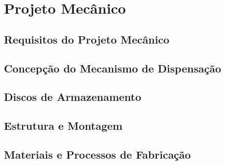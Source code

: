 
\chapter{Projeto Mecânico}
\label{chap:projeto-mecanico}


\section{Requisitos do Projeto Mecânico}
\label{sec:requisitos-mecanicos}


\section{Concepção do Mecanismo de Dispensação}
\label{sec:concepcao-mecanica}


\section{Discos de Armazenamento}
\label{sec:discos-armazenamento}


\section{Estrutura e Montagem}
\label{sec:estrutura-montagem}


\section{Materiais e Processos de Fabricação}
\label{sec:materiais-fabricacao}


